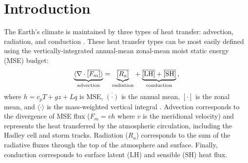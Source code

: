 \documentclass{ametsocV5}
\begin{document}




\section{Introduction}

The Earth's climate is maintained by three types of heat transfer: advection, radiation, and conduction \citep{hartmann2016}. These heat transfer types can be most easily defined using the vertically-integrated annual-mean zonal-mean moist static energy (MSE) budget:
\begin{equation} \label{eq:mse-ann}
    {\underbrace{ \langle\nabla\cdot \overline{[F_{m}]}\rangle}_{\text{advection}}} = {\underbrace{\vphantom{\nabla\cdot \langle [F_{m}]\rangle} \overline{[R_{a}]}}_\text{radiation}} + {\underbrace{\vphantom{\nabla\cdot \langle [F_{m}]\rangle} \mathrm{\overline{[LH]}+\overline{[SH]}}}_\text{conduction}} \, ,
\end{equation}
where $h=c_p T + gz + Lq$ is MSE, $\overline{(\cdot)}$ is the annual mean, $[\cdot]$ is the zonal mean, and $\langle \cdot \rangle$ is the mass-weighted vertical integral \citep{neelin1987}. Advection corresponds to the divergence of MSE flux ($F_m=vh$ where $v$ is the meridional velocity) and represents the heat transferred by the atmospheric circulation, including the Hadley cell and storm tracks. Radiation ($R_a$) corresponds to the sum of the radiative fluxes through the top of the atmosphere and surface. Finally, conduction corresponds to surface latent ($\mathrm{LH}$) and sensible ($\mathrm{SH}$) heat flux.
\end{document}
